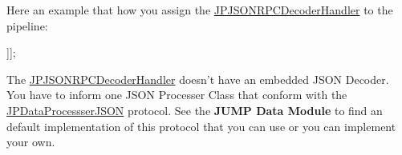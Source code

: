 Here an example that how you assign the \hyperlink{a00015}{JPJSONRPCDecoderHandler} to the pipeline: 
\begin{DoxyCode}
 [pipeline addLast:@"JSONRPCDecoder" withHandler:[JPJSONRPCDecoderHandler initWit
      hJSONDecoderClass:[JSONEncoder class]]];
\end{DoxyCode}
 The \hyperlink{a00015}{JPJSONRPCDecoderHandler} doesn't have an embedded JSON Decoder. You have to inform one JSON Processer Class that conform with the \hyperlink{a00009}{JPDataProcessserJSON} protocol. See the {\bfseries JUMP Data Module} to find an default implementation of this protocol that you can use or you can implement your own.  